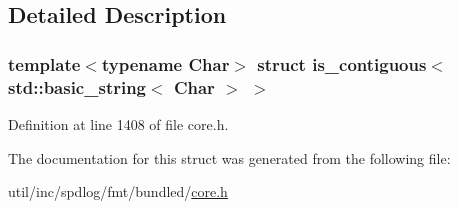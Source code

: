 \subsection{Detailed Description}
\subsubsection*{template$<$typename Char$>$\newline
struct is\+\_\+contiguous$<$ std\+::basic\+\_\+string$<$ Char $>$ $>$}



Definition at line 1408 of file core.\+h.



The documentation for this struct was generated from the following file\+:\begin{DoxyCompactItemize}
\item 
util/inc/spdlog/fmt/bundled/\hyperlink{core_8h}{core.\+h}\end{DoxyCompactItemize}
